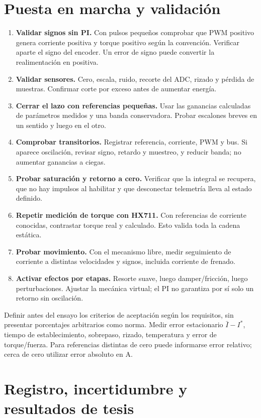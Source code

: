 \documentclass[11pt,a4paper]{article}
\begin{document}
\section{Puesta en marcha y validación}
\begin{enumerate}
\item \textbf{Validar signos sin PI.} Con pulsos pequeños comprobar que PWM positivo genera corriente positiva y torque positivo según la convención. Verificar aparte el signo del encoder. Un error de signo puede convertir la realimentación en positiva.
\item \textbf{Validar sensores.} Cero, escala, ruido, recorte del ADC, rizado y pérdida de muestras. Confirmar corte por exceso antes de aumentar energía.
\item \textbf{Cerrar el lazo con referencias pequeñas.} Usar las ganancias calculadas de parámetros medidos y una banda conservadora. Probar escalones breves en un sentido y luego en el otro.
\item \textbf{Comprobar transitorios.} Registrar referencia, corriente, PWM y bus. Si aparece oscilación, revisar signo, retardo y muestreo, y reducir banda; no aumentar ganancias a ciegas.
\item \textbf{Probar saturación y retorno a cero.} Verificar que la integral se recupera, que no hay impulsos al habilitar y que desconectar telemetría lleva al estado definido.
\item \textbf{Repetir medición de torque con HX711.} Con referencias de corriente conocidas, contrastar torque real y calculado. Esto valida toda la cadena estática.
\item \textbf{Probar movimiento.} Con el mecanismo libre, medir seguimiento de corriente a distintas velocidades y signos, incluida corriente de frenado.
\item \textbf{Activar efectos por etapas.} Resorte suave, luego damper/fricción, luego perturbaciones. Ajustar la mecánica virtual; el PI no garantiza por sí solo un retorno sin oscilación.
\end{enumerate}

Definir antes del ensayo los criterios de aceptación según los requisitos, sin presentar porcentajes arbitrarios como norma. Medir error estacionario $\bar I-I^*$, tiempo de establecimiento, sobrepaso, rizado, temperatura y error de torque/fuerza. Para referencias distintas de cero puede informarse error relativo; cerca de cero utilizar error absoluto en A.

\section{Registro, incertidumbre y resultados de tesis}
\end{document}
